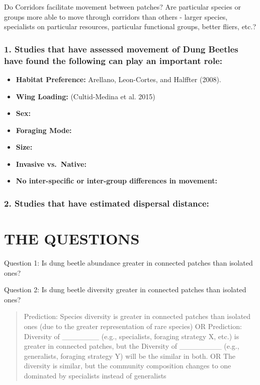 \documentclass[
  12pt,
]{article}
\begin{document}
Do Corridors facilitate movement between patches? Are particular species
or groups more able to move through corridors than others - larger
species, specialists on particular resources, particular functional
groups, better fliers, etc.?

\hypertarget{studies-that-have-assessed-movement-of-dung-beetles-have-found-the-following-can-play-an-important-role}{%
\subsubsection{1. Studies that have assessed movement of Dung Beetles
have found the following can play an important
role:}\label{studies-that-have-assessed-movement-of-dung-beetles-have-found-the-following-can-play-an-important-role}}

\begin{itemize}
\item
  \textbf{Habitat Preference:} Arellano, Leon-Cortes, and Halffter
  (2008).
\item
  \textbf{Wing Loading:} (Cultid-Medina et al. 2015)
\item
  \textbf{Sex:}
\item
  \textbf{Foraging Mode:}
\item
  \textbf{Size:}
\item
  \textbf{Invasive vs.~Native:}
\item
  \textbf{No inter-specific or inter-group differences in movement:}
\end{itemize}

\hypertarget{studies-that-have-estimated-dispersal-distance}{%
\subsubsection{2. Studies that have estimated dispersal
distance:}\label{studies-that-have-estimated-dispersal-distance}}

\newpage

\hypertarget{the-questions}{%
\section{THE QUESTIONS}\label{the-questions}}

Question 1: Is dung beetle abundance greater in connected patches than
isolated ones?

Question 2: Is dung beetle diversity greater in connected patches than
isolated ones?

\begin{quote}
Prediction: Species diversity is greater in connected patches than
isolated ones (due to the greater representation of rare species) OR
Prediction: Diversity of \_\_\_\_\_\_\_ (e.g., specialists, foraging
strategy X, etc.) is greater in connected patches, but the Diversity of
\_\_\_\_\_\_\_\_ (e.g., generalists, foraging strategy Y) will be the
similar in both. OR The diversity is similar, but the community
composition changes to one dominated by specialists instead of
generalists
\end{quote}
\end{document}
